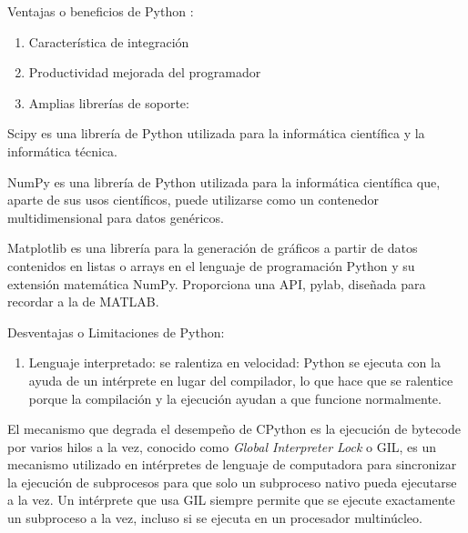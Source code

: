 Ventajas o beneficios de Python \parencite{PythonVentajas}:
\begin{enumerate}
\item  Característica de integración
\item  Productividad mejorada del programador
\item  Amplias librerías de soporte:
\end{enumerate}

Scipy es una librería de Python utilizada para la informática científica y la informática técnica. \newline

NumPy es una librería de Python utilizada para la informática científica que, aparte de sus usos científicos, puede utilizarse como un contenedor multidimensional para datos genéricos.\newline

Matplotlib es una librería para la generación de gráficos a partir de datos contenidos en listas o arrays en el lenguaje de programación Python y su extensión matemática NumPy. Proporciona una API, pylab, diseñada para recordar a la de MATLAB.\newline

Desventajas o Limitaciones de Python:
\begin{enumerate}
\item  Lenguaje interpretado: se ralentiza en velocidad: Python se ejecuta con la ayuda de un intérprete en lugar del compilador, lo que hace que se ralentice porque la compilación y la ejecución ayudan a que funcione normalmente.
\end{enumerate}

El mecanismo que degrada el desempeño de CPython es la ejecución de bytecode por varios hilos a la vez, conocido como \textit{Global Interpreter Lock} o GIL, es un mecanismo utilizado en intérpretes de lenguaje de computadora para sincronizar la ejecución de subprocesos para que solo un subproceso nativo pueda ejecutarse a la vez. Un intérprete que usa GIL siempre permite que se ejecute exactamente un subproceso a la vez, incluso si se ejecuta en un procesador multinúcleo.

